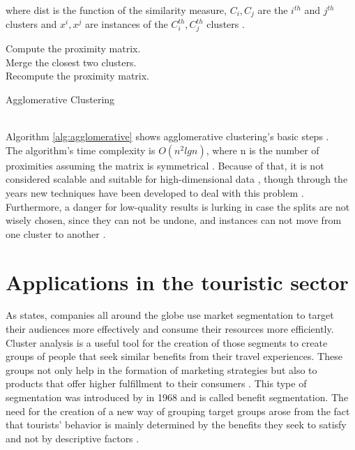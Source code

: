where dist is the function of the similarity measure, \(C_{i}, C_{j}\) are the \(i^{th}\) and \(j^{th}\) clusters and \(x^{i}, x^{j}\) are instances of the \(C_{i}^{th}, C_{j}^{th}\) clusters \autocite[460]{han}.
\begin{algorithm}
\SetAlgoLined
{}
Compute the proximity matrix. \\
{
Merge the closest two clusters.\\
Recompute the proximity matrix.
}
\caption{Agglomerative Clustering}\label{alg:agglomerative}
\end{algorithm} \\
Algorithm \ref{alg:agglomerative} shows agglomerative clustering's basic steps \autocite{dunham, tanSteinKum}. \\
The algorithm's time complexity is \(O(n^{2}lgn)\), where n is the number of proximities assuming the matrix is symmetrical \autocite{dunham, tanSteinKum}. Because of that, it is not considered scalable and suitable for high-dimensional data \autocite{tanSteinKum,kantar}, though through the years new techniques have been developed to deal with this problem \autocite{survey}. Furthermore, a danger for low-quality results is lurking in case the splits are not wisely chosen, since they can not be undone, and instances can not move from one cluster to another \autocite{han}.
\section{Applications in the touristic sector}
\label{applications}
As \textcite{data-drivenSegmentation} states, companies all around the globe use market segmentation to target their audiences more effectively and consume their resources more efficiently. Cluster analysis is a useful tool for the creation of those segments to create groups of people that seek similar benefits from their travel experiences. These groups not only help in the formation of marketing strategies but also to products that offer higher fulfillment to their consumers \autocite[17]{data-drivenSegmentation}. This type of segmentation was introduced by \textcite{Haley} in 1968 and is called benefit segmentation. The need for the creation of a new way of grouping target groups arose from the fact that tourists' behavior is mainly determined by the benefits they seek to satisfy and not by descriptive factors \autocite[31]{Haley}. \\
